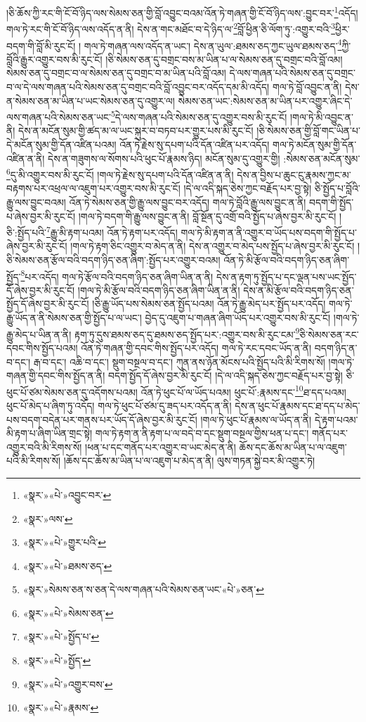 །ཅི་ཆོས་ཀྱི་རང་གི་ངོ་བོ་ཉིད་ལས་སེམས་ཅན་གྱི་བློ་འབྱུང་བའམ་འོན་ཏེ་གཞན་གྱི་ངོ་བོ་ཉིད་ལས་:བྱུང་བར་\footnote{«སྣར་»«པེ་»འབྱུང་བར་}འདོད། གལ་ཏེ་རང་གི་ངོ་བོ་ཉིད་ལས་འདོད་ན་ནི། དེས་ན་གང་མཐོང་བ་དེ་ཉིད་ལ་\footnote{«སྣར་»ལས་}བློ་ཕྱིན་ཅི་ལོག་ཏུ་:འགྱུར་བའི་\footnote{«སྣར་»«པེ་»གྱུར་པའི་}ཕྱིར་བདག་གི་བློ་མི་རུང་ངོ། །
གལ་ཏེ་གཞན་ལས་འདོད་ན་ཡང་། དེས་ན་ཡུལ་:ཐམས་ཅད་ཀྱང་ཡུལ་ཐམས་ཅད་\footnote{«སྣར་»«པེ་»ཐམས་ཅད་}ཀྱི་བློའི་རྒྱུར་འགྱུར་བས་མི་རུང་ངོ། །ཅི་སེམས་ཅན་དུ་བགྲང་བས་མ་ཡིན་པ་ལ་སེམས་ཅན་དུ་བགྲང་བའི་བློ་འམ། སེམས་ཅན་དུ་བགྲང་བ་ལ་སེམས་ཅན་དུ་བགྲང་བ་མ་ཡིན་པའི་བློ་འམ། དེ་ལས་གཞན་པའི་སེམས་ཅན་དུ་བགྲང་བ་ལ་དེ་ལས་གཞན་པའི་སེམས་ཅན་དུ་བགྲང་བའི་བློ་འབྱུང་བར་འདོད་དམ་མི་འདོད། གལ་ཏེ་བློ་འབྱུང་ན་ནི། དེས་ན་སེམས་ཅན་མ་ཡིན་པ་ཡང་སེམས་ཅན་དུ་འགྱུར་ལ། སེམས་ཅན་ཡང་:སེམས་ཅན་མ་ཡིན་པར་འགྱུར་ཞིང་དེ་ལས་གཞན་པའི་སེམས་ཅན་ཡང་\footnote{«སྣར་»སེམས་ཅན་ས་ཅན་དེ་ལས་གཞན་པའི་སེམས་ཅན་ཡང་«པེ་»ཅན་}དེ་ལས་གཞན་པའི་སེམས་ཅན་དུ་འགྱུར་བས་མི་རུང་ངོ། །གལ་ཏེ་མི་འབྱུང་ན་ནི། དེས་ན་མངོན་སུམ་གྱི་ཚད་མ་ལ་ཡང་སྐུར་བ་བཏབ་པར་གྱུར་པས་མི་རུང་ངོ། །ཅི་སེམས་ཅན་གྱི་བློ་གང་ཡིན་པ་དེ་མངོན་སུམ་གྱི་དོན་འཛིན་པའམ། འོན་ཏེ་རྗེས་སུ་དཔག་པའི་དོན་འཛིན་པར་འདོད། གལ་ཏེ་མངོན་སུམ་གྱི་དོན་འཛིན་ན་ནི། དེས་ན་གཟུགས་ལ་སོགས་པའི་ཕུང་པོ་རྣམས་ཉིད། མངོན་སུམ་དུ་འགྱུར་གྱི། :སེམས་ཅན་མངོན་སུམ་\footnote{«སྣར་»«པེ་»སེམས་ཅན་}དུ་མི་འགྱུར་བས་མི་རུང་ངོ། །གལ་ཏེ་རྗེས་སུ་དཔག་པའི་དོན་འཛིན་ན་ནི། དེས་ན་བྱིས་པ་ཆུང་ངུ་རྣམས་ཀྱང་མ་བརྟགས་པར་འཕྲལ་ལ་འཇུག་པར་འགྱུར་བས་མི་རུང་ངོ། །དེ་ལ་འདི་སྐད་ཅེས་ཀྱང་བརྗོད་པར་བྱ་སྟེ། ཅི་སྤྱོད་པ་བློའི་རྒྱུ་ལས་བྱུང་བའམ། འོན་ཏེ་སེམས་ཅན་གྱི་རྒྱུ་ལས་བྱུང་བར་འདོད། གལ་ཏེ་བློའི་རྒྱུ་ལས་བྱུང་ན་ནི། བདག་གི་སྤྱོད་པ་ཞེས་བྱར་མི་རུང་ངོ། །གལ་ཏེ་བདག་གི་རྒྱུ་ལས་བྱུང་ན་ནི། བློ་སྔོན་དུ་འགྲོ་བའི་སྤྱོད་པ་ཞེས་བྱར་མི་རུང་ངོ། །ཅི་:སྤྱོད་པའི་\footnote{«སྣར་»«པེ་»སྤྱོད་པ་}རྒྱུ་མི་རྟག་པའམ། འོན་ཏེ་རྟག་པར་འདོད། གལ་ཏེ་མི་རྟག་ན་ནི་འགྱུར་བ་ཡོད་པས་བདག་གི་སྤྱོད་པ་ཞེས་བྱར་མི་རུང་ངོ། །གལ་ཏེ་རྟག་ཅིང་འགྱུར་བ་མེད་ན་ནི། དེས་ན་འགྱུར་བ་མེད་པས་སྤྱོད་པ་ཞེས་བྱར་མི་རུང་ངོ། །ཅི་སེམས་ཅན་རྩོལ་བའི་བདག་ཉིད་ཅན་ཞིག་:སྤྱོད་པར་འགྱུར་བའམ། འོན་ཏེ་མི་རྩོལ་བའི་བདག་ཉིད་ཅན་ཞིག་སྤྱོད་\footnote{«སྣར་»«པེ་»སྤྱོད་}པར་འདོད། གལ་ཏེ་རྩོལ་བའི་བདག་ཉིད་ཅན་ཞིག་ཡིན་ན་ནི། དེས་ན་རྟག་ཏུ་སྤྱོད་པ་དང་ལྡན་པས་ཡང་སྤྱོད་དོ་ཞེས་བྱར་མི་རུང་ངོ། །གལ་ཏེ་མི་རྩོལ་བའི་བདག་ཉིད་ཅན་ཞིག་ཡིན་ན་ནི། དེས་ན་མི་རྩོལ་བའི་བདག་ཉིད་ཅན་སྤྱོད་དོ་ཞེས་བྱར་མི་རུང་ངོ། །ཅི་རྒྱུ་ཡོད་པས་སེམས་ཅན་སྤྱོད་པའམ། འོན་ཏེ་རྒྱུ་མེད་པར་སྤྱོད་པར་འདོད། གལ་ཏེ་རྒྱུ་ཡོད་ན་ནི་སེམས་ཅན་གྱི་སྤྱོད་པ་ལ་ཡང་། བྱེད་དུ་འཇུག་པ་གཞན་ཞིག་ཡོད་པར་འགྱུར་བས་མི་རུང་ངོ། །གལ་ཏེ་རྒྱུ་མེད་པ་ཡིན་ན་ནི། རྟག་ཏུ་དུས་ཐམས་ཅད་དུ་ཐམས་ཅད་སྤྱོད་པར་:འགྱུར་བས་མི་རུང་ངམ་\footnote{«སྣར་»«པེ་»འགྱུར་བས་}ཅི་སེམས་ཅན་རང་དབང་གིས་སྤྱོད་པའམ། འོན་ཏེ་གཞན་གྱི་དབང་གིས་སྤྱོད་པར་འདོད། གལ་ཏེ་རང་དབང་ཡོད་ན་ནི། བདག་ཉིད་ན་བ་དང་། རྒ་བ་དང་། འཆི་བ་དང་། སྡུག་བསྔལ་བ་དང་། ཀུན་ནས་ཉོན་མོངས་པའི་སྤྱོད་པའི་མི་རིགས་སོ། །གལ་ཏེ་གཞན་གྱི་དབང་གིས་སྤྱོད་ན་ནི། བདག་སྤྱོད་དོ་ཞེས་བྱར་མི་རུང་ངོ། །དེ་ལ་འདི་སྐད་ཅེས་ཀྱང་བརྗོད་པར་བྱ་སྟེ། ཅི་ཕུང་པོ་ཙམ་སེམས་ཅན་དུ་འདོགས་པའམ། འོན་ཏེ་ཕུང་པོ་ལ་ཡོད་པའམ། ཕུང་པོ་:རྣམས་དང་\footnote{«སྣར་»«པེ་»རྣམས་}ཐ་དད་པའམ། ཕུང་པོ་མེད་པ་ཞིག་ཏུ་འདོད། གལ་ཏེ་ཕུང་པོ་ཙམ་དུ་ཟད་པར་འདོད་ན་ནི། དེས་ན་ཕུང་པོ་རྣམས་དང་ཐ་དད་པ་མེད་པས་བདག་བདེན་པར་གནས་པར་ཡོད་དོ་ཞེས་བྱར་མི་རུང་ངོ། །གལ་ཏེ་ཕུང་པོ་རྣམས་ལ་ཡོད་ན་ནི། དེ་རྟག་པའམ་མི་རྟག་པ་ཞིག་ཡིན་གྲང་སྟེ། གལ་ཏེ་རྟག་ན་ནི་རྟག་པ་ལ་བདེ་བ་དང་སྡུག་བསྔལ་གྱིས་ཕན་པ་དང་། གནོད་པར་འགྱུར་བའི་མི་རིགས་སོ། །ཕན་པ་དང་གནོད་པར་འགྱུར་བ་ཡང་མེད་ན་ནི། ཆོས་དང་ཆོས་མ་ཡིན་པ་ལ་འཇུག་པའི་མི་རིགས་སོ། །ཆོས་དང་ཆོས་མ་ཡིན་པ་ལ་འཇུག་པ་མེད་ན་ནི། ལུས་གཏན་སྐྱེ་བར་མི་འགྱུར་ཏེ། 